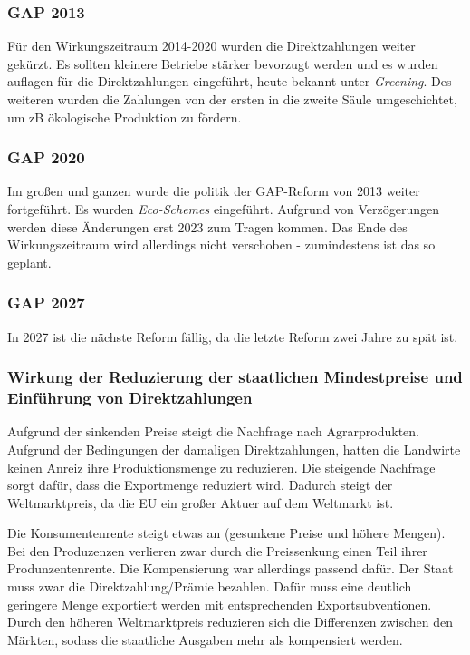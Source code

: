 \documentclass[11pt]{scrbook}
\begin{document}
\subsubsection{GAP 2013}
Für den Wirkungszeitraum 2014-2020 wurden die Direktzahlungen weiter gekürzt.
Es sollten kleinere Betriebe stärker bevorzugt werden und es wurden auflagen für die Direktzahlungen eingeführt, heute bekannt unter \textit{Greening}.
Des weiteren wurden die Zahlungen von der ersten in die zweite Säule umgeschichtet, um zB ökologische Produktion zu fördern.

\subsubsection{GAP 2020}
Im großen und ganzen wurde die politik der \ac{GAP}-Reform von 2013 weiter fortgeführt.
Es wurden \textit{Eco-Schemes} eingeführt.
Aufgrund von Verzögerungen werden diese Änderungen erst 2023 zum Tragen kommen.
Das Ende des Wirkungszeitraum wird allerdings nicht verschoben - zumindestens ist das so geplant.

\subsubsection{GAP 2027}
In 2027 ist die nächste Reform fällig, da die letzte Reform zwei Jahre zu spät ist.

\subsubsection{Wirkung der Reduzierung der staatlichen Mindestpreise und Einführung von Direktzahlungen}
\label{subsubsec:mindest}
Aufgrund der sinkenden Preise steigt die Nachfrage nach Agrarprodukten.
Aufgrund der Bedingungen der damaligen Direktzahlungen, hatten die Landwirte keinen Anreiz ihre Produktionsmenge zu reduzieren.
Die steigende Nachfrage sorgt dafür, dass die Exportmenge reduziert wird.
Dadurch steigt der Weltmarktpreis, da die \ac{EU} ein großer Aktuer auf dem Weltmarkt ist.

Die Konsumentenrente steigt etwas an (gesunkene Preise und höhere Mengen).
Bei den Produzenzen verlieren zwar durch die Preissenkung einen Teil ihrer Produnzentenrente.
Die Kompensierung war allerdings passend dafür.
Der Staat muss zwar die Direktzahlung/Prämie bezahlen.
Dafür muss eine deutlich geringere Menge exportiert werden mit entsprechenden Exportsubventionen.
Durch den höheren Weltmarktpreis reduzieren sich die Differenzen zwischen den Märkten, sodass die staatliche Ausgaben mehr als kompensiert werden.
\end{document}
